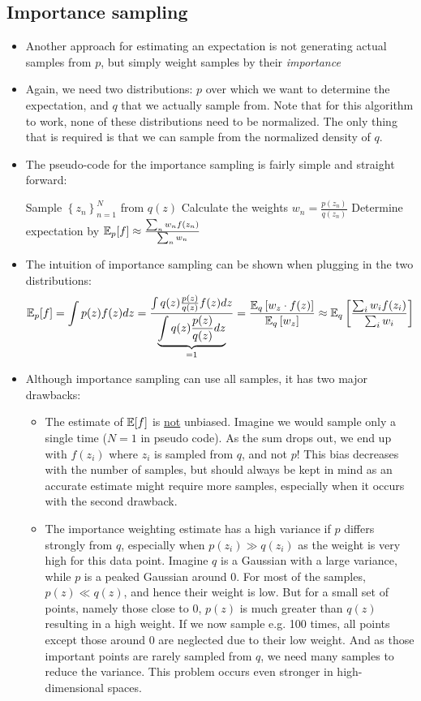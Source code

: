 \subsection{Importance sampling}
\begin{itemize}
	\item Another approach for estimating an expectation is not generating actual samples from $p$, but simply weight samples by their \textit{importance}
	\item Again, we need two distributions: $p$ over which we want to determine the expectation, and $q$ that we actually sample from. Note that for this algorithm to work, none of these distributions need to be normalized. The only thing that is required is that we can sample from the normalized density of $q$.
	\item The pseudo-code for the importance sampling is fairly simple and straight forward: \begin{tcolorbox}[colback=white!85!gray,colframe=gray!75!black,title=Pseudocode for importance sampling]
		\begin{algorithm}[H]
			\SetAlgoLined
			Sample $\left\{z_n\right\}_{n=1}^{N}$ from $q(z)$\;
			Calculate the weights $w_n=\frac{p(z_n)}{q(z_n)}$\;
			Determine expectation by $\mathbb{E}_p[f]\approx \frac{\sum_n w_n f(z_n)}{
			\sum_n w_n}$\;
		\end{algorithm}
	\end{tcolorbox}
	\item The intuition of importance sampling can be shown when plugging in the two distributions:
	$$\mathbb{E}_p[f]=\int p(z)f(z)dz=\frac{\int q(z)\frac{p(z)}{q(z)}f(z)dz}{\underbrace{\int q(z)\frac{p(z)}{q(z)}dz}_{=1}} = \frac{\mathbb{E}_q\left[w_z\cdot f(z)\right]}{\mathbb{E}_q\left[w_z\right]} \approx \mathbb{E}_q\left[\frac{\sum_i w_i f(z_i)}{\sum_i w_i}\right]$$
	\item Although importance sampling can use all samples, it has two major drawbacks:
	\begin{itemize}
		\item The estimate of $\mathbb{E}[f]$ is \underline{not} unbiased. Imagine we would sample only a single time ($N=1$ in pseudo code). As the sum drops out, we end up with $f(z_i)$ where $z_i$ is sampled from $q$, and not $p$! This bias decreases with the number of samples, but should always be kept in mind as an accurate estimate might require more samples, especially when it occurs with the second drawback.
		\item The importance weighting estimate has a high variance if $p$ differs strongly from $q$, especially when $p(z_i)\gg q(z_i)$ as the weight is very high for this data point. Imagine $q$ is a Gaussian with a large variance, while $p$ is a peaked Gaussian around 0. For most of the samples, $p(z)\ll q(z)$, and hence their weight is low. But for a small set of points, namely those close to 0, $p(z)$ is much greater than $q(z)$ resulting in a high weight. If we now sample e.g. 100 times, all points except those around 0 are neglected due to their low weight. And as those important points are rarely sampled from $q$, we need many samples to reduce the variance. This problem occurs even stronger in high-dimensional spaces.

\end{itemize}
\end{itemize}
